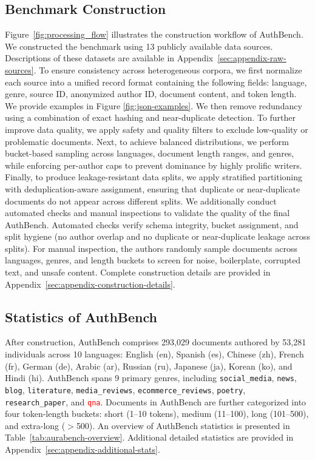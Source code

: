 \documentclass[11pt]{article}
\newcommand{\rev}[1]{\textcolor{red}{#1}}
\begin{document}
\subsection{Benchmark Construction}
\label{sec:construction}
Figure~\ref{fig:processing_flow} illustrates the construction workflow of AuthBench. We constructed the benchmark using 13 publicly available data sources. Descriptions of these datasets are available in Appendix~\ref{sec:appendix-raw-sources}. To ensure consistency across heterogeneous corpora, we first normalize each source into a unified record format containing the following fields: language, genre, source ID, anonymized author ID, document content, and token length. We provide examples in Figure \ref{fig:json-examples}. We then remove redundancy using a combination of exact hashing and near-duplicate detection. To further improve data quality, we apply safety and quality filters to exclude low-quality or problematic documents. Next, to achieve balanced distributions, we perform bucket-based sampling across languages, document length ranges, and genres, while enforcing per-author caps to prevent dominance by highly prolific writers. Finally, to produce leakage-resistant data splits, we apply stratified partitioning with deduplication-aware assignment, ensuring that duplicate or near-duplicate documents do not appear across different splits. We additionally conduct automated checks and manual inspections to validate the quality of the final AuthBench. Automated checks verify schema integrity, bucket assignment, and split hygiene (no author overlap and no duplicate or near-duplicate leakage across splits). For manual inspection, the authors randomly sample documents across languages, genres, and length buckets to screen for noise, boilerplate, corrupted text, and unsafe content. Complete construction details are provided in Appendix~\ref{sec:appendix-construction-details}.

\subsection{Statistics of AuthBench}
\label{sec:statbench}

After construction, AuthBench comprises 293{,}029 documents authored by 53{,}281 individuals across 10 languages: English (en), Spanish (es), Chinese (zh), French (fr), German (de), Arabic (ar), Russian (ru), Japanese (ja), Korean (ko), and Hindi (hi). AuthBench spans 9 primary genres, including \texttt{social\_media}, \texttt{news}, \texttt{blog}, \texttt{literature}, \texttt{media\_reviews}, \texttt{ecommerce\_reviews}, \texttt{poetry}, \texttt{research\_paper}, and \rev{\texttt{qna}}. Documents in AuthBench are further categorized into four token-length buckets: short (1–10 tokens), medium (11–100), long (101–500), and extra-long ($>$500). An overview of AuthBench statistics is presented in Table~\ref{tab:aurabench-overview}. Additional detailed statistics are provided in Appendix~\ref{sec:appendix-additional-stats}.
\end{document}
